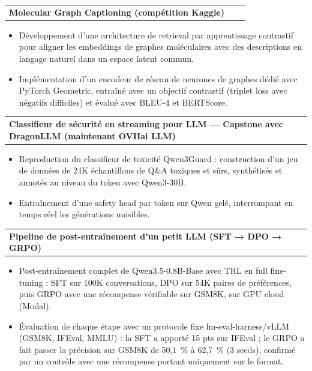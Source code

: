 \documentclass[a4paper,10pt]{article}
\makeatletter
\newenvironment{project}[2]
    {
    \begin{tabularx}{\linewidth}{@{}l X r@{}}
    \textbf{#1} & \hfill & #2
    \end{tabularx}
    \begin{minipage}[t]{\linewidth}
    \begin{itemize}[nosep,after=\strut, leftmargin=1em, itemsep=0pt,label=--]
    }
    {
    \end{itemize}
    \end{minipage}
    }
\makeatother
\begin{document}
\begin{project}{Molecular Graph Captioning (compétition Kaggle)}
{\href{https://github.com/maxencedbe/molecular_graph_captioning}{\textcolor{black}{\raisebox{-0.05\height}{\large \faGithub}}}}
    \item Développement d'une architecture de retrieval par apprentissage contrastif pour aligner les embeddings de graphes moléculaires avec des descriptions en langage naturel dans un espace latent commun.
    \item Implémentation d'un encodeur de réseau de neurones de graphes dédié avec PyTorch Geometric, entraîné avec un objectif contrastif (triplet loss avec négatifs difficiles) et évalué avec BLEU-4 et BERTScore.
\end{project}\vspace{-6pt}

\begin{project}{Classifieur de sécurité en streaming pour LLM --- Capstone avec DragonLLM (maintenant OVHai LLM)}
{\href{https://github.com/maxencedbe/capstone_dragonllm}{\textcolor{black}{\raisebox{-0.05\height}{\large \faGithub}}}}
    \item Reproduction du classifieur de toxicité Qwen3Guard : construction d'un jeu de données de 24K échantillons de Q\&A toxiques et sûrs, synthétisés et annotés au niveau du token avec Qwen3-30B.
    \item Entraînement d'une safety head par token sur Qwen gelé, interrompant en temps réel les générations nuisibles.
\end{project}\vspace{-6pt}

\begin{project}{Pipeline de post-entraînement d'un petit LLM (SFT → DPO → GRPO)}
{\href{https://github.com/maxencedbe/small-llm-post-training}{\textcolor{black}{\raisebox{-0.05\height}{\large \faGithub}}}}
    \item Post-entraînement complet de Qwen3.5-0.8B-Base avec TRL en full fine-tuning : SFT sur 100K conversations, DPO sur 54K paires de préférences, puis GRPO avec une récompense vérifiable sur GSM8K, sur GPU cloud (Modal).
    \item Évaluation de chaque étape avec un protocole fixe lm-eval-harness/vLLM (GSM8K, IFEval, MMLU) : la SFT a apporté 15 pts sur IFEval ; le GRPO a fait passer la précision sur GSM8K de 50,1~\% à 62,7~\% (3 seeds), confirmé par un contrôle avec une récompense portant uniquement sur le format.
\end{project} \\[-16pt]
\end{document}
